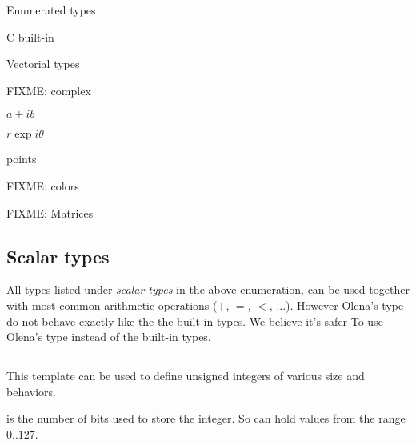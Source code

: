 \begin{list}{--}{}
\begin{list}{--}{}
\begin{list}{--}{}
    \end{list}
  \end{list}
\item Enumerated types
  \begin{list}{--}{}
  \item C built-in 
  \item {}
  \item {}
  \end{list}
\item Vectorial types
  \begin{list}{--}{}
  \item FIXME: complex
    \begin{list}{--}{}
    \item $a+ib$
    \item $r\exp{i\theta}$
    \end{list}
  \item points
    \begin{list}{--}{}
    \item {}
    \item {}
    \item {}
    \end{list}
  \item {}
  \item FIXME: colors
  \end{list}
\item FIXME: Matrices
\end{list}

\subsection{Scalar types}

All types listed under \emph{scalar types} in the above enumeration,
can be used together with most common arithmetic operations ($+$, $=$,
$<$, ...).  However Olena's type do not behave exactly like the
the built-in types.  We believe it's safer To
use Olena's type instead of the built-in types.

\subsection{}

This template can be used to define unsigned integers of various size
and behaviors.

 is the number of bits used to store the
integer.  So  can hold values from the range $0..127$.

